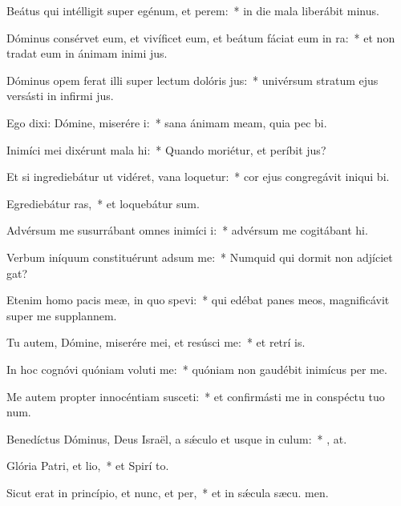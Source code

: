 \item Beátus qui intélligit super egénum, et perem:~* in die mala liberábit  minus.
\item Dóminus consérvet eum, et vivíficet eum, et beátum fáciat eum in ra:~* et non tradat eum in ánimam inimi jus.
\item Dóminus opem ferat illi super lectum dolóris jus:~* univérsum stratum ejus versásti in infirmi jus.
\item Ego dixi: Dómine, miserére i:~* sana ánimam meam, quia pec bi.
\item Inimíci mei dixérunt mala hi:~* Quando moriétur, et períbit  jus?
\item Et si ingrediebátur ut vidéret, vana loquetur:~* cor ejus congregávit iniqui bi.
\item Egrediebátur ras,~* et loquebátur  sum.
\item Advérsum me susurrábant omnes inimíci i:~* advérsum me cogitábant  hi.
\item Verbum iníquum constituérunt adsum me:~* Numquid qui dormit non adjíciet  gat?
\item Etenim homo pacis meæ, in quo spevi:~* qui edébat panes meos, magnificávit super me supplannem.
\item Tu autem, Dómine, miserére mei, et resúsci me:~* et retrí is.
\item In hoc cognóvi quóniam voluti me:~* quóniam non gaudébit inimícus  per me.
\item Me autem propter innocéntiam susceti:~* et confirmásti me in conspéctu tuo  num.
\item Benedíctus Dóminus, Deus Israël, a sǽculo et usque in culum:~* , at.
\item Glória Patri, et lio,~* et Spirí to.
\item Sicut erat in princípio, et nunc, et per,~* et in sǽcula sæcu. men.
